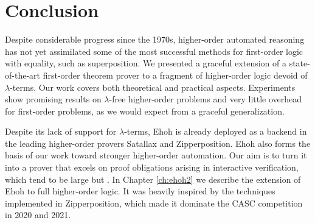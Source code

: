 \section{Conclusion}
\label{sec:ehoh:conclusion}

Despite considerable progress since the 1970s, higher-order automated
reasoning has not yet assimilated some of the most successful methods for
first-order logic with equality, such as superposition. We presented a
graceful extension of a state-of-the-art first-order theorem prover to a
fragment of higher-order logic devoid of $\lambda$-terms. Our work
covers both theoretical and practical aspects. Experiments show promising
results on $\lambda$-free higher-order problems and very little overhead for
first-order problems, as we would expect from a graceful generalization.

\begin{sloppypar}
Despite its lack of support for $\lambda$-terms, Ehoh is already deployed
as a backend in the leading higher-order provers Satallax and
Zipperposition. Ehoh also forms the basis of our work toward stronger
higher-order automation. Our aim is to turn it into a prover that excels on
proof obligations arising in interactive verification, which tend to be
large but  \cite{ns-13-leo2sh}.
In Chapter \ref{ch:ehoh2} we describe the extension of Ehoh to full higher-order logic.
It was heavily inspired by the techniques implemented in Zipperposition, which made it
dominate the CASC competition in 2020 and 2021.
\end{sloppypar}
